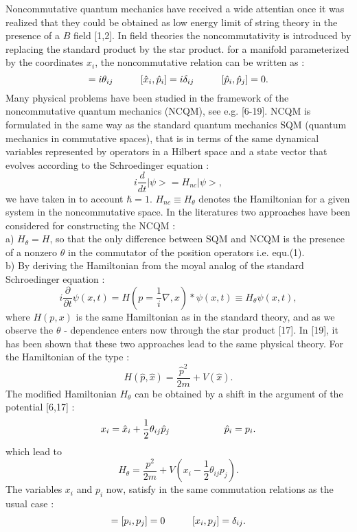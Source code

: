 \documentclass[a4paper,a4paper]{article}
\begin{document}
Noncommutative quantum mechanics have received a wide attentian
once it was realized that they could be obtained as low energy
limit of string theory in the presence of a $B$ field [1,2]. In
field theories the noncommutativity is introduced by replacing the
standard product by the star product. for a manifold parameterized
by the coordinates $x_{i}$, the noncommutative relation can be
written as :
\begin{equation}
[\hat{x}_{i},\hat{x}_{j}]=i\theta_{ij}\hspace{1.cm}[\hat{x}_{i},\hat{p}_{i}]=i\delta
_{ij}\hspace{1.cm} [\hat{p}_{i},\hat{p}_{j}]=0 .
\end{equation}
Many physical problems have been studied in the framework of the
noncommutative quantum mechanics (NCQM), see e.g. [6-19]. NCQM is
formulated in the same way as the standard quantum mechanics SQM
(quantum mechanics in commutative spaces), that is in terms of the
same dynamical variables represented by operators in a Hilbert
space and a state vector that evolves according to the
Schroedinger equation :
\begin{equation}
i\frac{d}{dt}|\psi>=H_{nc}|\psi> ,
\end{equation}
we have taken in to account $\hbar=1$. $H_{nc}\equiv H_{\theta}$
denotes the Hamiltonian for a given system in the noncommutative
space. In the literatures two
approaches have been considered  for constructing the NCQM :\\
a) $H_{\theta}=H$, so that the only difference between SQM and
NCQM is the presence of a nonzero $\theta$ in the commutator of
the position operators i.e. equ.(1). \\
b) By deriving the Hamiltonian from the moyal analog of the
standard Schroedinger equation :
\begin{equation}
i\frac{\partial}{\partial t}\psi(x,t)=H(p=\frac{1}{i}\nabla,x)\ast
\psi (x,t)\equiv H_{\theta}\psi(x,t) ,
\end{equation}
where $H(p,x)$ is the same Hamiltonian as in the standard theory,
and as we observe the $\theta$ - dependence enters now through the
star product [17]. In [19], it has been shown that these two
approaches lead to the same physical theory. For the Hamiltonian
of the type :
\begin{equation}
H(\hat{p},\hat{x})=\frac{\hat{p}^{2}}{2m}+V(\hat{x}) .
\end{equation}
The modified Hamiltonian $H_{\theta}$ can be obtained by a shift
in the argument of the potential [6,17] :
\begin{equation}
x_{i}=\hat{x}_{i}+\frac{1}{2}\theta_{ij}\hat{p}_{j}\hspace{2.cm}\hat{p}_{i}=p_{i}
.
\end{equation}
which lead to
\begin{equation}
H_{\theta}=\frac{p^{2}}{2m}+V(x_{i}-\frac{1}{2}\theta_{ij}p_{j}) .
\end{equation}
The variables $x_{i}$ and $p_{i}$ now, satisfy in the same
commutation relations as the usual case :
\begin{equation}
[x_{i},x_{j}]=[p_{i},p_{j}]=0\hspace{1.cm}[x_{i},p_{j}]=\delta_{ij} .
\end{equation}
\end{document}
